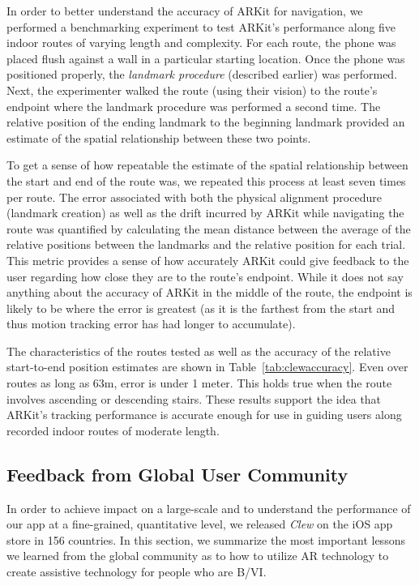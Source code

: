 \documentclass[chi_draft]{sigchi}
\newcommand{\BVI}{B/VI\xspace}
\begin{document}
In order to better understand the accuracy of ARKit for navigation, we performed a benchmarking experiment to test ARKit's performance along five indoor routes of varying length and complexity.  For each route, the phone was placed flush against a wall in a particular starting location.  Once the phone was positioned properly, the \emph{landmark procedure} (described earlier) was performed.  Next, the experimenter walked the route (using their vision) to the route's endpoint where the landmark procedure was  performed a second time.  The relative position of the ending landmark to the beginning landmark provided an estimate of the spatial relationship between these two points.

To get a sense of how repeatable the estimate of the spatial relationship between the start and end of the route was, we repeated this process at least seven times per route.  The error associated with both the physical alignment procedure (landmark creation) as well as the drift incurred by ARKit while navigating the route was quantified by calculating the mean distance between the average of the relative positions between the landmarks and the relative position for each trial.  This metric provides a sense of how accurately ARKit could give feedback to the user regarding how close they are to the route's endpoint.  While it does not say anything about the accuracy of ARKit in the middle of the route, the endpoint is likely to be where the error is greatest (as it is the farthest from the start and thus motion tracking error has had longer to accumulate).

The characteristics of the routes tested as well as the accuracy of the relative start-to-end position estimates are shown in Table~\ref{tab:clewaccuracy}.  Even over routes as long as 63m, error is under 1 meter.  This holds true  when the route involves ascending or descending stairs.  These results support the idea that ARKit's tracking performance is accurate enough for use in guiding users along recorded indoor routes of moderate length.

\subsection{Feedback from Global User Community}
In order to achieve impact on a large-scale and to understand the performance of our app at a fine-grained, quantitative level, we released \emph{Clew} on the iOS app store in 156 countries.  In this section, we summarize the most important lessons we learned from the global community as to how to utilize AR technology to create assistive technology for people who are \BVI.
\end{document}
